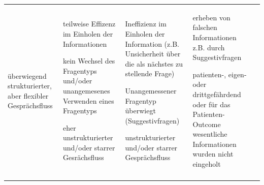 \begin{gWideParEnv}
\begin{tabulary}{\linewidth}{LLLLL}
überwiegend strukturierter, aber flexibler Gesprächsfluss
&
teilweise Effizenz im Einholen der Informationen

kein Wechsel des Fragentyps und/oder unangemesenes Verwenden
eines Fragentyps

eher unstrukturierter und/oder starrer Gesrächsfluss
&
Ineffizienz im Einholen der Information (z.B. Unsicherheit über die als
nächstes zu stellende Frage)

Unangemessener Fragentyp überwiegt (Suggestivfragen)

unstrukturierter und/oder starrer Gesprächsfluss
&
erheben von falschen Informationen z.B. durch Suggestivfragen

patienten-, eigen- oder drittgefährdend oder für das Patienten-Outcome
wesentliche Informationen wurden nicht eingeholt
 \\\addlinespace\hline
\end{tabulary}


\end{gWideParEnv}

